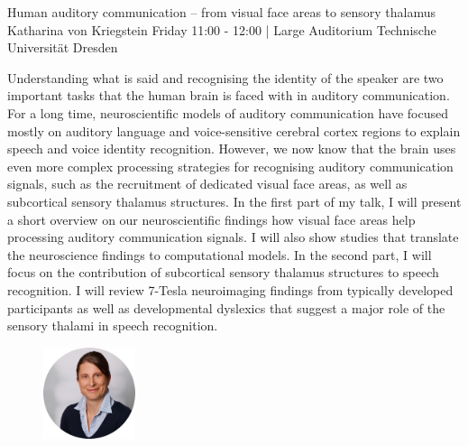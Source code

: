 
\begin{keynote}
    {Human auditory communication – from visual face areas to sensory thalamus}
    {Katharina von Kriegstein}
    {Friday 11:00 - 12:00 | Large Auditorium}
    {Technische Universität Dresden}

    Understanding what is said and recognising the identity of the speaker are two important tasks that the human brain is faced with in auditory communication. For a long time, neuroscientific models of auditory communication have focused mostly on auditory language and voice-sensitive cerebral cortex regions to explain speech and voice identity recognition. However, we now know that the brain uses even more complex processing strategies for recognising auditory communication signals, such as the recruitment of dedicated visual face areas, as well as subcortical sensory thalamus structures. In the first part of my talk, I will present a short overview on our neuroscientific findings how visual face areas help processing auditory communication signals. I will also show studies that translate the neuroscience findings to computational models. In the second part, I will focus on the contribution of subcortical sensory thalamus structures to speech recognition. I will review 7-Tesla neuroimaging findings from typically developed participants as well as developmental dyslexics that suggest a major role of the sensory thalami in speech recognition.

    \vspace*{1cm}

    \begin{figure}[H]
        \raggedleft
        \includegraphics[width=0.24\textwidth]{tex/images/keynote_speaker/kriegstein_cropped.png}
    \end{figure}

\end{keynote}
